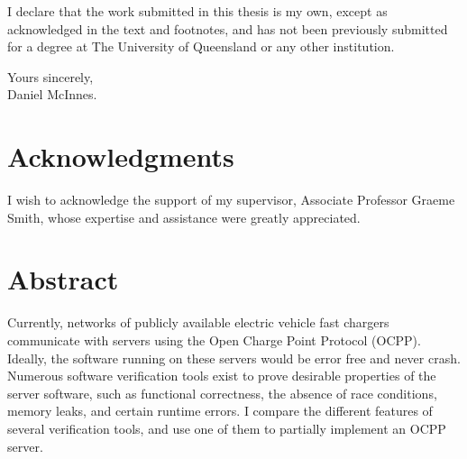 \documentclass[12pt,openany,a4paper]{book}
\begin{document}
I declare that the work submitted in this thesis is my own, except as
acknowledged in the text and footnotes, and has not been previously
submitted for a degree at The University of Queensland or any other
institution.

\begin{flushright}
	Yours sincerely,\\
	\medskip
	\medskip
	Daniel McInnes.
\end{flushright}

\cleardoublepage


\chapter{Acknowledgments}

I wish to acknowledge the support of my supervisor, Associate Professor Graeme Smith, whose expertise and assistance were greatly appreciated.
\cleardoublepage

\chapter{Abstract}

Currently, networks of publicly available electric vehicle fast chargers communicate with servers using the Open Charge Point Protocol (OCPP). Ideally, the software running on these servers would be error free and never crash. Numerous software verification tools exist to prove desirable properties of the server software, such as functional correctness, the absence of race conditions, memory leaks, and certain runtime errors. I compare the different features of several verification tools, and use one of them to partially implement an OCPP server.

\tableofcontents

\listoffigures
{}

\listoftables
{}

% 
\end{document}
